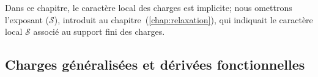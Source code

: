%
%
%
%


Dans ce chapitre, le caractère local des charges est implicite; nous omettrons l’exposant ($\mathcal{S}$), introduit au chapitre~(\ref{chap:relaxation}), qui indiquait le caractère local $\mathcal{S}$ associé au support fini des charges.


\subsection{Charges généralisées et dérivées fonctionnelles}



